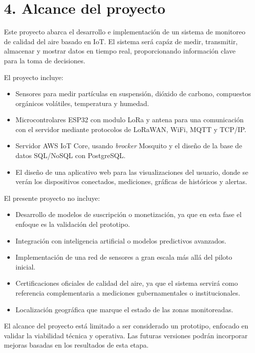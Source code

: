 \documentclass[
11pt, %
]{charter}
\begin{document}
\section{4. Alcance del proyecto}
\label{sec:alcance}

Este proyecto abarca el desarrollo e implementación de un sistema de monitoreo de calidad del aire basado en IoT. El sistema será capáz de medir, transmitir, almacenar y mostrar datos en tiempo real, proporcionando información clave para la toma de decisiones.

El proyecto incluye:

\begin{itemize}
	\item Sensores para medir partículas en suspensión, dióxido de carbono, compuestos orgánicos volátiles, temperatura y humedad.
	\item Microcontrolares ESP32 con modulo LoRa y antena para una comunicación con el servidor mediante protocolos de LoRaWAN, WiFi, MQTT y TCP/IP.
	\item Servidor AWS IoT Core, usando \textit{brocker} Mosquito y el diseño de la base de datos SQL/NoSQL con PostgreSQL.
	\item El diseño de una aplicativo web para las visualizaciones del usuario, donde se verán los dispositivos conectados, mediciones, gráficas de históricos y alertas.
	
	
\end{itemize}

El presente proyecto no incluye:
\begin{itemize}
	\item Desarrollo de modelos de suscripción o monetización, ya que en esta fase el enfoque es la validación del prototipo.
	\item Integración con inteligencia artificial o modelos predictivos avanzados.
	\item Implementación de una red de sensores a gran escala más allá del piloto inicial.
	\item Certificaciones oficiales de calidad del aire, ya que el sistema servirá como referencia complementaria a mediciones gubernamentales o institucionales.
	\item Localización geográfica que marque el estado de las zonas monitoreadas.
\end{itemize}

El alcance del proyecto está limitado a ser considerado un prototipo, enfocado en validar la viabilidad técnica y operativa. Las futuras versiones podrán incorporar mejoras basadas en los resultados de esta etapa.
\end{document}
